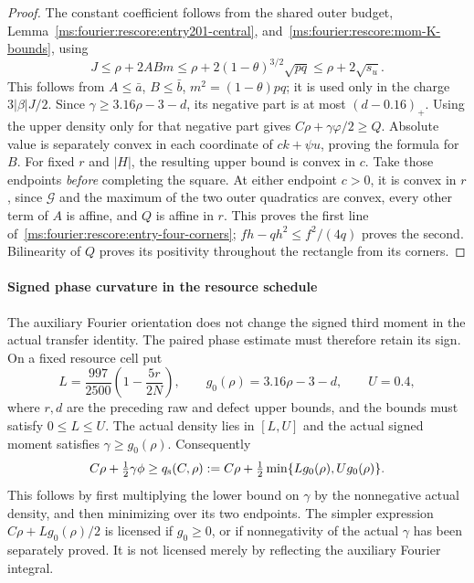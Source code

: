 \begin{proof}
The constant coefficient follows from the shared outer budget,
Lemma~\ref{ms:fourier:rescore:entry201-central}, and~\eqref{ms:fourier:rescore:mom-K-bounds}, using
\[
 J\le\rho+2ABm\le\rho+2(1-\theta)^{3/2}\sqrt{pq}
       \le\rho+2\sqrt{s_u}.
\]
This follows from $A\le\bar a$, $B\le\bar b$, $m^2=(1-\theta)pq$;
it is used only in the charge $3|\beta|J/2$. Since $\gamma\ge3.16\rho-3-d$, its negative
part is at most $(d-0.16)_+$. Using the upper density only for that negative
part gives $C\rho+\gamma\varphi/2\ge Q$. Absolute value is separately
convex in each coordinate of $ck+\psi u$, proving the formula for $B$.
For fixed $r$ and $|H|$, the resulting upper bound is convex in $c$.
Take those endpoints \emph{before} completing the square. At either
endpoint $c>0$, it is convex in $r$, since $\mathcal G$ and the maximum of the two outer quadratics are
convex, every other term of $A$ is affine, and $Q$ is affine in $r$. This proves the first line of~\eqref{ms:fourier:rescore:entry-four-corners};
$fh-qh^2\le f^2/(4q)$ proves the second. Bilinearity of $Q$ proves
its positivity throughout the rectangle from its corners.

\end{proof}

\paragraph{Signed phase curvature in the resource schedule}
\label{ms:fourier:rescore:re-signed-phase-repair}
The auxiliary Fourier orientation does not change the signed third moment
in the actual transfer identity. The paired phase estimate must therefore
retain its sign. On a fixed resource cell put
\[
 L=\frac{997}{2500}\left(1-\frac{5r}{2N}\right),\qquad
 g_0(\rho)=3.16\rho-3-d,\qquad U=0.4,
\]
where $r,d$ are the preceding raw and defect upper bounds, and the
bounds must satisfy $0\le L\le U$. The actual density lies in $[L,U]$
and the actual signed moment satisfies $\gamma\ge g_0(\rho)$. Consequently
\begin{equation}\label{ms:fourier:rescore:re-sign-aware-price}
 C\rho+\tfrac12\gamma\phi
 \ge q_{\rm s}(C,\rho):=
 C\rho+\tfrac12\min\{L g_0(\rho),U g_0(\rho)\}.
\end{equation}
This follows by first multiplying the lower bound on $\gamma$ by the
nonnegative actual density, and then minimizing over its two endpoints.
The simpler expression $C\rho+Lg_0(\rho)/2$ is licensed if $g_0\ge0$,
or if nonnegativity of the actual $\gamma$ has been separately proved.
It is not licensed merely by reflecting the auxiliary Fourier integral.

